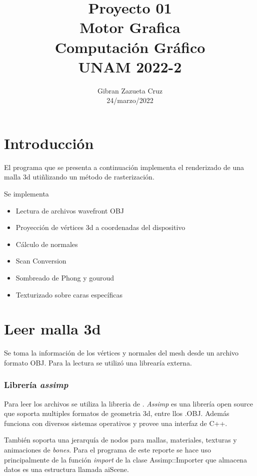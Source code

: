 \documentclass[12pt]{article}
\title{%
  Proyecto 01\\
  \large Motor Grafica \\
    \Large Computación Gráfico\\
     \large UNAM 2022-2}
\author{Gibran Zazueta Cruz \\
\small 24/marzo/2022}
\date{}
\begin{document}
\maketitle

\section{Introducción}

El programa que se presenta a continuación implementa el renderizado de una malla 3d utiñlizando un método de rasterización. 

Se implementa
\begin{itemize}
\item Lectura de archivos wavefront OBJ

\item Proyección de vértices 3d a coordenadas del dispositivo

\item Cálculo de normales

\item Scan Conversion

\item Sombreado de Phong y gouroud

\item Texturizado sobre caras específicas


\end{itemize}

\section{Leer malla 3d}

Se toma la información de los vértices y normales del mesh desde un archivo formato OBJ.
Para la lectura se utilizó una librearía externa.

\subsubsection{Librería \textit{assimp}}

Para leer los archivos se utiliza la libreria de . 
\textit{Assimp} es una librería open source que soporta multiples formatos de geometria 3d, entre llos .OBJ. Además funciona con diversos sistemas operativos y provee una interfaz de C++.

También soporta una jerarquía de nodos para mallas, materiales, texturas y animaciones de \textit{bones}. Para el programa de este reporte se hace uso principalmente de la función \textit{import} de la clase Assimp::Importer que almacena datos es una estructura llamada aiScene.
\end{document}
